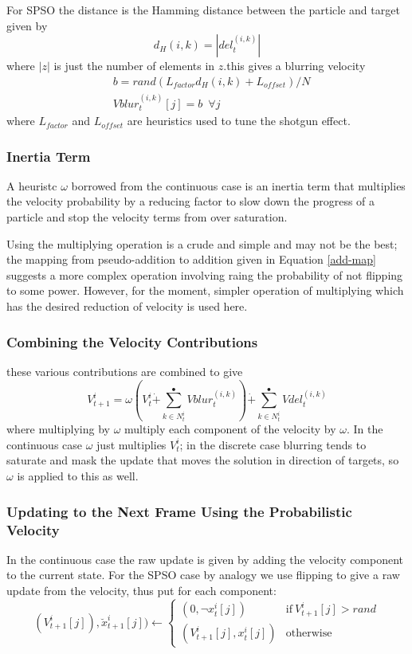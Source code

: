 \documentclass[a4paper,oneside,english]{article}
\numberwithin{equation}{section}
\numberwithin{figure}{section}
\begin{document}
For SPSO the distance is the Hamming distance between the particle and target given by
\begin{equation}\label{H-dist}
d_H(i,k)=|del_t^{(i,k)}|
\end{equation}
where $|z|$ is just the number of elements in $z$.this gives a blurring velocity
\begin{align}\label{blur-vel}
&b=rand(L_{factor}d_H(i,k)+L_{offset})/N\\
&Vblur_t^{(i,k)}[j]=b\:\; \forall j
\end{align}
where $L_{factor}$ and $L_{offset}$ are heuristics used to tune the shotgun effect.
\subsubsection{Inertia Term}
A heuristc $\omega$ borrowed from the continuous case is an inertia  term that multiplies the velocity probability by a reducing factor to slow down the progress of a particle and stop the velocity terms from over saturation.

Using the multiplying operation is a crude and simple and may not be the best; the mapping from pseudo-addition to addition given in Equation \ref{add-map} suggests a more complex operation involving raing the probability of not flipping to some power. However, for the moment, simpler operation of multiplying which has the desired reduction of velocity is used here.
     
\subsubsection{Combining the Velocity Contributions}

these various contributions are combined to give
\begin{equation}\label{tot-velocity}
V_{t+1}^i=\omega\left (V_t^i\dot{+}\sum_{k \in N_t^i}^\bullet Vblur_t^{(i,k)}\right )\dot{+}\sum_{k \in N_t^i}^\bullet Vdel_t^{(i,k)}
\end{equation}
where multiplying by $\omega$ multiply each component of the velocity by $\omega$. In the continuous case  $\omega$ just multiplies $V_t^i$;
in the discrete case blurring tends to saturate and mask the update that moves the solution in direction of targets, so $\omega$ is applied to this as well.
         
\subsubsection{Updating to the Next Frame Using the Probabilistic Velocity}
In the continuous case the raw update is given by adding the velocity component to the current state. For the SPSO case by analogy we use flipping to give a raw update from the velocity,
thus put for each component:
\begin{equation}\label{raw_update}
(V_{t+1}^i[j]),\breve{x}_{t+1}^i[j]) \leftarrow\left\lbrace 
\begin{array}{cc}
(0,\neg x_t^i[j])&\mathrm{if}\:V_{t+1}^i[j]>rand \\
(V_{t+1}^i[j],x_t^i[j])&\mathrm{otherwise}
\end{array}\right.
\end{equation}
 
\end{document}
